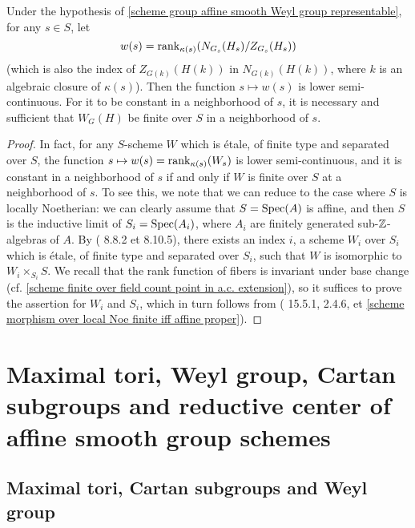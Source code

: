 \begin{corollary}\label{scheme group affine smooth Weyl group fiber rank semicontinuous}
Under the hypothesis of \cref{scheme group affine smooth Weyl group representable}, for any $s\in S$, let 
\[w(s)=\mathrm{rank}_{\kappa(s)}(N_{G_s}(H_s)/Z_{G_s}(H_s))\]
(which is also the index of $Z_{G(k)}(H(k))$ in $N_{G(k)}(H(k))$, where $k$ is an algebraic closure of $\kappa(s)$). Then the function $s\mapsto w(s)$ is lower semi-continuous. For it to be constant in a neighborhood of $s$, it is necessary and sufficient that $W_G(H)$ be finite over $S$ in a neighborhood of $s$.
\end{corollary}
\begin{proof}
In fact, for any $S$-scheme $W$ which is \'etale, of finite type and separated over $S$, the function $s\mapsto w(s)=\mathrm{rank}_{\kappa(s)}(W_s)$ is lower semi-continuous, and it is constant in a neighborhood of $s$ if and only if $W$ is finite over $S$ at a neighborhood of $s$. To see this, we note that we can reduce to the case where $S$ is locally Noetherian: we can clearly assume that $S=\mathrm{Spec}(A)$ is affine, and then $S$ is the inductive limit of $S_i=\mathrm{Spec}(A_i)$, where $A_i$ are finitely generated sub-$\mathbb{Z}$-algebras of $A$. By (\cite{EGA4-3} 8.8.2 et 8.10.5), there exists an index $i$, a scheme $W_i$ over $S_i$ which is \'etale, of finite type and separated over $S_i$, such that $W$ is isomorphic to $W_i\times_{S_i}S$. We recall that the rank function of fibers is invariant under base change (cf. \cref{scheme finite over field count point in a.c. extension}), so it suffices to prove the assertion for $W_i$ and $S_i$, which in turn follows from (\cite{EGA4-3} 15.5.1, \cite{EGA4-2} 2.4.6, et \cref{scheme morphism over local Noe finite iff affine proper}).
\end{proof}

\section{Maximal tori, Weyl group, Cartan subgroups and reductive center of affine smooth group schemes}
\subsection{Maximal tori, Cartan subgroups and Weyl group}
